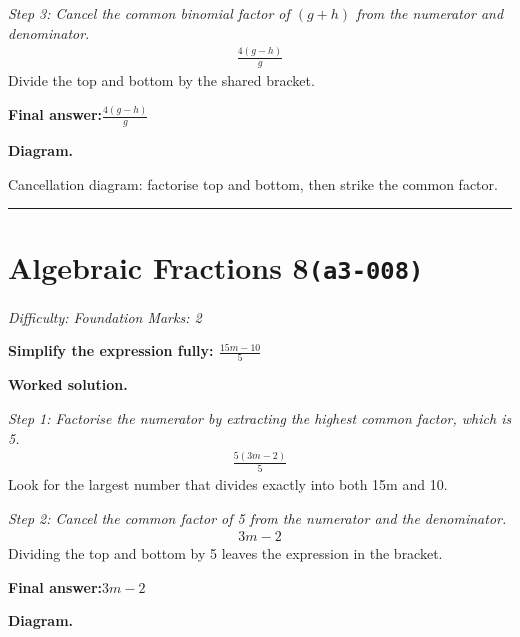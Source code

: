 \documentclass[11pt]{article}
\newcommand{\question}[1]{\par\medskip\noindent\textbf{#1}\par}
\begin{document}
\textit{Step 3: Cancel the common binomial factor of \( (g+h) \) from the numerator and denominator.}
\[\begin{gathered}
\frac{4(g-h)}{g}
\end{gathered}\]
Divide the top and bottom by the shared bracket.

\begin{answerbox}
\textbf{Final answer:}\quad \(\displaystyle \frac{4(g-h)}{g}\)
\end{answerbox}
\textbf{Diagram.}

\begin{center}
\end{center}
\small Cancellation diagram: factorise top and bottom, then strike the common factor.\normalsize

\medskip\hrule

\section*{Algebraic Fractions 8\quad\small\texttt{(a3-008)}}
\textit{Difficulty: Foundation \quad\textbar\quad Marks: 2}

\question{Simplify the expression fully: \( \frac{15m - 10}{5} \)}

\textbf{Worked solution.}

\textit{Step 1: Factorise the numerator by extracting the highest common factor, which is 5.}
\[\begin{gathered}
\frac{5(3m - 2)}{5}
\end{gathered}\]
Look for the largest number that divides exactly into both 15m and 10.

\textit{Step 2: Cancel the common factor of 5 from the numerator and the denominator.}
\[\begin{gathered}
3m - 2
\end{gathered}\]
Dividing the top and bottom by 5 leaves the expression in the bracket.

\begin{answerbox}
\textbf{Final answer:}\quad \(\displaystyle 3m - 2\)
\end{answerbox}
\textbf{Diagram.}
\end{document}
